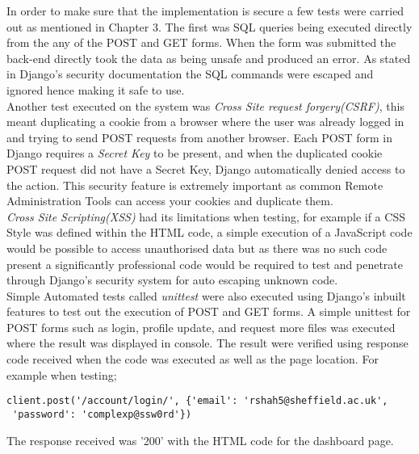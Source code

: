 \documentclass[../main.tex]{subfiles}
\begin{document}
\raggedright
In order to make sure that the implementation is secure a few tests were carried out as mentioned in Chapter 3. The first was SQL queries being executed directly from the any of the POST and GET forms. When the form was submitted the back-end directly took the data as being unsafe and produced an error. As stated in Django's security documentation\cite{djangoSecurity} the SQL commands were escaped and ignored hence making it safe to use. \\[4mm]

Another test executed on the system was \textit{Cross Site request forgery(CSRF)}, this meant duplicating a cookie from a browser where the user was already logged in and trying to send POST requests from another browser. Each POST form in Django requires a \textit{Secret Key} to be present, and when the duplicated cookie POST request did not have a Secret Key, Django automatically denied access to the action. This security feature is extremely important as common Remote Administration Tools can access your cookies and duplicate them. \\[4mm]

\textit{Cross Site Scripting(XSS)} had its limitations when testing, for example if a CSS Style was defined within the HTML code, a simple execution of a JavaScript code would be possible to access unauthorised data but as there was no such code present a significantly professional code would be required to test and penetrate through Django's security system for auto escaping unknown code. \\[4mm]

Simple Automated tests called \textit{unittest} were also executed using Django's inbuilt features to test out the execution of POST and GET forms. A simple unittest for POST forms such as login, profile update, and request more files was executed where the result was displayed in console. The result were verified using response code received when the code was executed as well as the page location. For example when testing; \\
\begin{verbatim}
client.post('/account/login/', {'email': 'rshah5@sheffield.ac.uk',
 'password': 'complexp@ssw0rd'}) 
\end{verbatim}
The response received was '200' with the HTML code for the dashboard page. \\[4mm]
\end{document}

